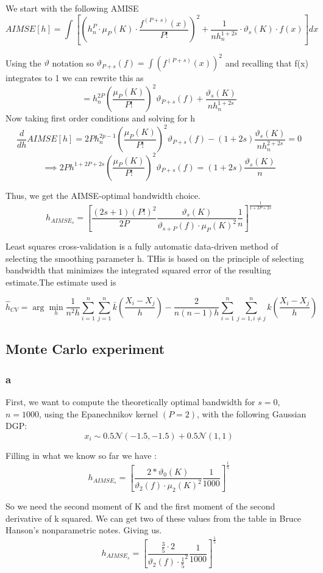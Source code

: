 \documentclass[11pt]{article}
\newcommand{\N}{\mathcal{N}}
\begin{document}
We start with the following AMISE
$$ AIMSE[h] = \int \left[ \left( h_n^P \cdot \mu_P(K) \cdot \frac{f^{(P+s)}(x)}{P!}   \right)^2 + \frac{1}{nh_n^{1+2s}} \cdot \vartheta_s(K) \cdot f(x) \right]dx
$$

Using the $\vartheta$ notation so $\vartheta_{P+s}(f) = \int(f^{(P+s)}(x))^2$ and recalling that f(x) integrates to 1 we can rewrite this as 
$$ =  h_n^{2P} \left( \frac{\mu_P(K)}{P!} \right)^2 \vartheta_{P+s}(f) + \frac{\vartheta_s(K)}{nh_n^{1+2s}}
$$
Now taking first order conditions and solving for h 
$$ \frac{d}{dh}AIMSE[h] =  2Ph_n^{2p-1} \left( \frac{\mu_P(K)}{P!} \right)^2 \vartheta_{P+s}(f) -(1+2s) \frac{\vartheta_s(K)}{nh_n^{2+2s}} =0
$$
$$ \implies 2Ph^{1+2P+2s}\left( \frac{\mu_P(K)}{P!} \right)^2 \vartheta_{P+s}(f) = (1+2s) \frac{\vartheta_s(K)}{n}
$$

Thus, we get the AIMSE-optimal bandwidth choice.
$$h_{AIMSE_s} = \left[ \frac{(2s+1)(P!)^2}{2P} \frac{\vartheta_s(K)}{\vartheta_{s+P}(f) \cdot \mu_P(K)^2} \frac{1}{n} \right]^{\frac{1}{1+2P+2s}}$$

Least squares cross-validation is a fully automatic data-driven method of selecting the smoothing parameter h. THis is based on the principle of selecting bandwidth that minimizes the integrated squared error of the resulting estimate.The estimate used is 

$$ \hat{h}_{CV} = \arg \min_{h} \frac{1}{n^2h} \sum_{i=1}^n \sum_{j=1}^n \bar{k} \left(\frac{X_i - X_j}{h}\right) - \frac{2}{n(n-1)h}\sum_{i=1}^n\sum_{j=1, i\neq j}^nk\left(\frac{X_i - X_j}{h}\right)
$$


\subsection{Monte Carlo experiment}

\subsubsection{a} First, we want to compute the theoretically optimal bandwidth for $s=0$, $n=1000$, using the Epanechnikov kernel $(P=2)$, with the following Gaussian DGP:
$$x_i \sim 0.5 \N(-1.5,-1.5) + 0.5\N(1,1)$$

Filling in what we know so far we have : 
$$h_{AIMSE_s} = \left[ \frac{2*\vartheta_0(K)}{\vartheta_{2}(f) \cdot \mu_2(K)^2} \frac{1}{1000} \right]^{\frac{1}{5}}$$

So we need the second moment of K and the first moment of the second derivative of k squared. We can get two of these values from the table in Bruce Hanson's nonparametric notes. Giving us. 
$$h_{AIMSE_s} = \left[ \frac{\frac{3}{5} \cdot 2}{\vartheta_{2}(f) \cdot \frac{1}{5}^2} \frac{1}{1000} \right]^{\frac{1}{5}}$$
\end{document}
